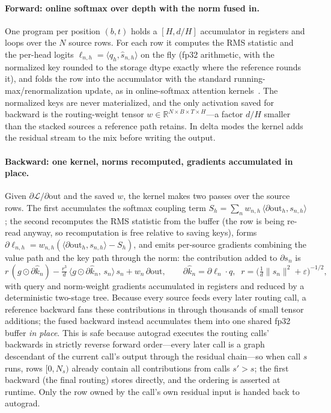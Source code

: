 \documentclass{article}
\begin{document}
\paragraph{Forward: online softmax over depth with the norm fused in.} One program
per position $(b,t)$ holds a $[H, d/H]$ accumulator in registers and loops over
the $N$ source rows. For each row it computes the RMS statistic and the per-head
logits $\ell_{n,h} = \langle q_h, \widehat{s}_{n,h}\rangle$ on the fly (fp32
arithmetic, with the normalized key rounded to the storage dtype exactly where the
reference rounds it), and folds the row into the accumulator with the standard
running-max/renormalization update, as in online-softmax attention
kernels~\citep{dao2022flashattention}. The normalized keys are never
materialized, and the only activation saved for backward is the routing-weight
tensor $w \in \mathbb{R}^{N \times B \times T \times H}$---a factor $d/H$ smaller
than the stacked sources a reference path retains. In delta modes the kernel adds
the residual stream to the mix before writing the output.

\paragraph{Backward: one kernel, norms recomputed, gradients accumulated in
place.} Given $\partial\mathcal{L}/\partial\mathrm{out}$ and the saved $w$, the
kernel makes two passes over the source rows. The first accumulates the softmax
coupling term $S_h = \sum_n w_{n,h}\,\langle \partial\mathrm{out}_h,
s_{n,h}\rangle$; the second recomputes the RMS statistic from the buffer (the
row is being re-read anyway, so recomputation is free relative to saving keys),
forms $\partial\ell_{n,h} = w_{n,h}(\langle \partial\mathrm{out}_h,
s_{n,h}\rangle - S_h)$, and emits per-source gradients combining the value path
and the key path through the norm: the contribution added to $\partial s_n$ is
\[
r\,(g \odot \partial\widehat{k}_n)
  - \tfrac{r^3}{d}\,\langle g \odot \partial\widehat{k}_n,\, s_n\rangle\, s_n
  + w_{n}\,\partial\mathrm{out},
\qquad
\partial\widehat{k}_n = \partial\ell_n \cdot q,\;\;
r = \big(\tfrac{1}{d}\lVert s_n\rVert^2 + \varepsilon\big)^{-1/2},
\]
with query and norm-weight gradients accumulated in registers and reduced by a
deterministic two-stage tree. Because every source feeds every later routing
call, a reference backward fans these contributions in through thousands of
small tensor additions; the fused backward instead accumulates them into one
shared fp32 buffer \emph{in place}. This is safe because autograd executes the
routing calls' backwards in strictly reverse forward order---every later call is
a graph descendant of the current call's output through the residual chain---so
when call $s$ runs, rows $[0, N_s)$ already contain all contributions from calls
$s' > s$; the first backward (the final routing) stores directly, and the
ordering is asserted at runtime. Only the row owned by the call's own residual
input is handed back to autograd.
\end{document}
